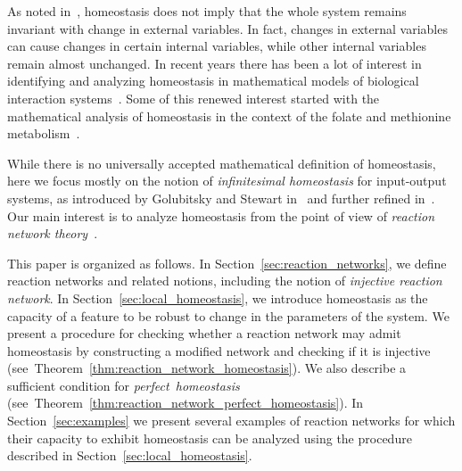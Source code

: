 \documentclass[11pt]{article}
\theoremstyle{plain}
\theoremstyle{definition}
\theoremstyle{remark}
\begin{document}
As noted in~\cite{reed2017analysis}, homeostasis does not imply that the whole system remains invariant with change in external variables. In fact, changes in external variables can cause changes in certain internal variables, while other internal variables remain almost unchanged. In recent years there has been a lot of interest in identifying and analyzing homeostasis in mathematical models of biological interaction systems~\cite{golubitsky2017homeostasis, nijhout2014homeostasis, reed2017analysis, nijhout2014escape,golubitsky2018homeostasis,tang2016design}. Some of this renewed interest started with the mathematical analysis of homeostasis in the context of the folate and methionine metabolism~\cite{nijhout2004mathematical,reed2017analysis}. 





While there is no universally accepted mathematical definition of homeostasis, here we focus mostly on the notion of \emph{infinitesimal homeostasis} for input-output systems, as introduced by Golubitsky and Stewart in~\cite{golubitsky2017homeostasis} and further refined in~\cite{wang2020structure, golubitsky2020input}. Our main interest is to analyze  homeostasis from the  point of view of {\em reaction network theory}~\cite{feinberg1979lectures,feinberg2019foundations,yu2018mathematical}. 

This paper is organized as follows. In Section~\ref{sec:reaction_networks}, we define reaction networks and related notions, including  the notion of {\em injective reaction network}. In Section~\ref{sec:local_homeostasis}, we introduce homeostasis as the capacity of a feature to be robust to change in the parameters of the system. We present a procedure for checking whether a reaction network may admit homeostasis by constructing a modified network and checking if it is injective (see~Theorem~\ref{thm:reaction_network_homeostasis}). 
We also describe a sufficient condition for {\em perfect~homeostasis} (see~Theorem~\ref{thm:reaction_network_perfect_homeostasis}). 
In Section~\ref{sec:examples} we present several examples of reaction networks for which their capacity to exhibit homeostasis can be analyzed using the procedure described in  Section~\ref{sec:local_homeostasis}.
\end{document}
